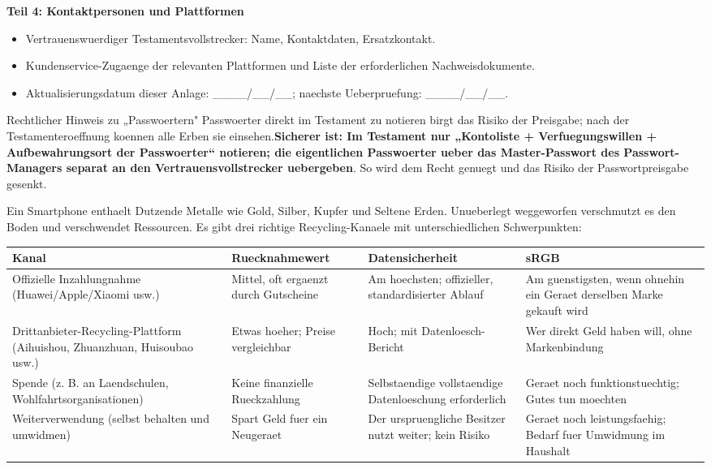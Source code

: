 \textbf{Teil 4: Kontaktpersonen und Plattformen}

\begin{itemize}
  \item Vertrauenswuerdiger Testamentsvollstrecker: Name, Kontaktdaten, Ersatzkontakt.
  \item Kundenservice-Zugaenge der relevanten Plattformen und Liste der erforderlichen Nachweisdokumente.
  \item Aktualisierungsdatum dieser Anlage: \_\_\_\_/\_\_/\_\_; naechste Ueberpruefung: \_\_\_\_/\_\_/\_\_.
\end{itemize}

\begin{tcbwarn}{Rechtlicher Hinweis zu „Passwoertern"}
Passwoerter direkt im Testament zu notieren birgt das Risiko der Preisgabe; nach der Testamenteroeffnung koennen alle Erben sie einsehen.\textbf{Sicherer ist: Im Testament nur „Kontoliste + Verfuegungswillen + Aufbewahrungsort der Passwoerter“ notieren; die eigentlichen Passwoerter ueber das Master-Passwort des Passwort-Managers separat an den Vertrauensvollstrecker uebergeben}. So wird dem Recht genuegt und das Risiko der Passwortpreisgabe gesenkt.

\end{tcbwarn}


Ein Smartphone enthaelt Dutzende Metalle wie Gold, Silber, Kupfer und Seltene Erden. Unueberlegt weggeworfen verschmutzt es den Boden und verschwendet Ressourcen. Es gibt drei richtige Recycling-Kanaele mit unterschiedlichen Schwerpunkten:

\begin{center}
\begin{tabularx}{\linewidth}{|X|X|X|X|}
\hline
\textbf{Kanal} & \textbf{Ruecknahmewert} & \textbf{Datensicherheit} & \textbf{sRGB} \tabularnewline
\hline
Offizielle Inzahlungnahme (Huawei/Apple/Xiaomi usw.) & Mittel, oft ergaenzt durch Gutscheine & Am hoechsten; offizieller, standardisierter Ablauf & Am guenstigsten, wenn ohnehin ein Geraet derselben Marke gekauft wird \tabularnewline
Drittanbieter-Recycling-Plattform (Aihuishou, Zhuanzhuan, Huisoubao usw.) & Etwas hoeher; Preise vergleichbar & Hoch; mit Datenloesch-Bericht & Wer direkt Geld haben will, ohne Markenbindung \tabularnewline
Spende (z. B. an Laendschulen, Wohlfahrtsorganisationen) & Keine finanzielle Rueckzahlung & Selbstaendige vollstaendige Datenloeschung erforderlich & Geraet noch funktionstuechtig; Gutes tun moechten \tabularnewline
Weiterverwendung (selbst behalten und umwidmen) & Spart Geld fuer ein Neugeraet & Der urspruengliche Besitzer nutzt weiter; kein Risiko & Geraet noch leistungsfaehig; Bedarf fuer Umwidmung im Haushalt \tabularnewline
\hline
\end{tabularx}
\end{center}


